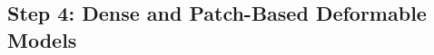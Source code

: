 




\vspace{0.3cm}
{\label{sec:step4}\subsection*{Step 4: Dense and Patch-Based Deformable Models}}





